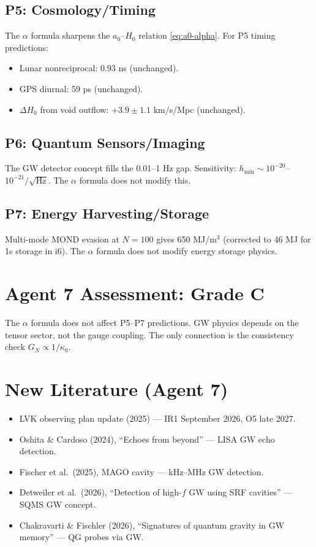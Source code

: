 \documentclass[11pt,a4paper]{article}
\begin{document}
\subsection{P5: Cosmology/Timing}

The $\alpha$ formula sharpens the $a_0$--$H_0$ relation \eqref{eq:a0-alpha}. For P5 timing predictions:
\begin{itemize}
\item Lunar nonreciprocal: 0.93 ns (unchanged).
\item GPS diurnal: 59 ps (unchanged).
\item $\Delta H_0$ from void outflow: $+3.9 \pm 1.1$ km/s/Mpc (unchanged).
\end{itemize}

\subsection{P6: Quantum Sensors/Imaging}

The GW detector concept fills the 0.01--1 Hz gap. Sensitivity: $h_{\min} \sim 10^{-20}$--$10^{-21}/\sqrt{\text{Hz}}$. The $\alpha$ formula does not modify this.

\subsection{P7: Energy Harvesting/Storage}

Multi-mode MOND evasion at $N = 100$ gives 650 MJ/m$^3$ (corrected to 46 MJ for 1s storage in i6). The $\alpha$ formula does not modify energy storage physics.

\section{Agent 7 Assessment: Grade C}

The $\alpha$ formula does not affect P5--P7 predictions. GW physics depends on the tensor sector, not the gauge coupling. The only connection is the consistency check $G_N \propto 1/\kappa_0$.

\section{New Literature (Agent 7)}

\begin{itemize}
\item LVK observing plan update (2025) --- IR1 September 2026, O5 late 2027.
\item Oshita \& Cardoso (2024), ``Echoes from beyond'' --- LISA GW echo detection.
\item Fischer et al.\ (2025), MAGO cavity --- kHz--MHz GW detection.
\item Detweiler et al.\ (2026), ``Detection of high-$f$ GW using SRF cavities'' --- SQMS GW concept.
\item Chakravarti \& Fischler (2026), ``Signatures of quantum gravity in GW memory'' --- QG probes via GW.
\end{itemize}
\end{document}
